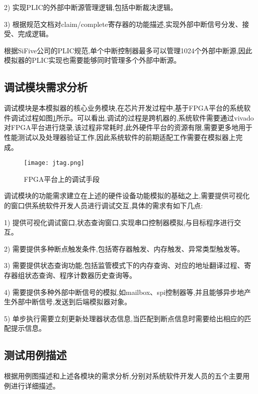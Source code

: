 2) 实现PLIC的外部中断源管理逻辑,包括中断裁决逻辑。


3) 根据规范文档对claim/complete寄存器的功能描述,实现外部中断信号分发、接受、完成逻辑。


根据SiFive公司的PLIC规范,单个中断控制器最多可以管理1024个外部中断源,因此模拟器的PLIC实现也需要能够同时管理多个外部中断源。


\subsection{调试模块需求分析}
调试模块是本模拟器的核心业务模块,在芯片开发过程中,基于FPGA平台的系统软件调试过程如图\ref{fig:jtag}所示。可以看出,调试的过程是跨机器的,系统软件需要通过vivado对FPGA平台进行烧录,该过程非常耗时,此外硬件平台的资源有限,需要更多地用于性能测试以及处理器验证工作,因此系统软件的前期适配工作需要在模拟器上完成。

\begin{figure}[H]
  \centering
  \texttt{[image: jtag.png]}
  \caption{FPGA平台上的调试手段}
  \label{fig:jtag}
\end{figure}

调试模块的功能需求建立在上述的硬件设备功能模拟的基础之上,需要提供可视化的窗口供系统软件开发人员进行调试交互,具体的需求有如下几点:


1) 提供可视化调试窗口,状态查询窗口,实现串口控制器模拟,与目标程序进行交互。


2) 需要提供多种断点触发条件,包括寄存器触发、内存触发、异常类型触发等。


3) 需要提供状态查询功能,包括监管模式下的内存查询、对应的地址翻译过程、寄存器组状态查询、程序计数器历史查询等。


4) 需要提供多种外部中断信号的模拟,如mailbox、spi控制器等,并且能够异步地产生外部中断信号,发送到后端模拟器对象。


5) 单步执行需要立刻更新处理器状态信息,当匹配到断点信息时需要给出相应的匹配提示信息。

\subsection{测试用例描述}

根据用例图描述和上述各模块的需求分析,分别对系统软件开发人员的五个主要用例进行详细描述。 


